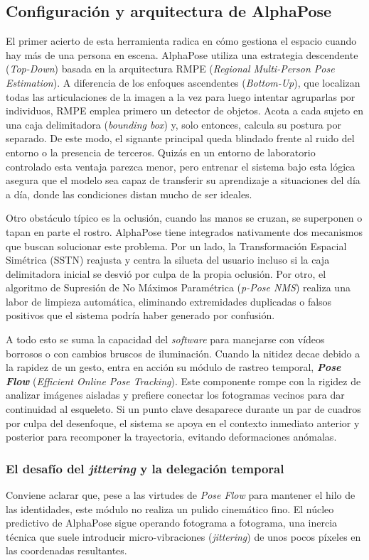\subsection{Configuración y arquitectura de AlphaPose}
El primer acierto de esta herramienta radica en cómo gestiona el espacio cuando hay más de una persona en escena.
AlphaPose utiliza una estrategia descendente (\textit{Top-Down}) basada en la arquitectura RMPE (\textit{Regional Multi-Person Pose Estimation}).
A diferencia de los enfoques ascendentes (\textit{Bottom-Up}), que localizan todas las articulaciones de la imagen a la vez para luego intentar agruparlas por individuos, RMPE emplea primero un detector de objetos.
Acota a cada sujeto en una caja delimitadora (\textit{bounding box}) y, solo entonces, calcula su postura por separado.
De este modo, el signante principal queda blindado frente al ruido del entorno o la presencia de terceros.
Quizás en un entorno de laboratorio controlado esta ventaja parezca menor, pero entrenar el sistema bajo esta lógica asegura que el modelo sea capaz de transferir su aprendizaje a situaciones del día a día, donde las condiciones distan mucho de ser ideales.

Otro obstáculo típico es la oclusión, cuando las manos se cruzan, se superponen o tapan en parte el rostro.
AlphaPose tiene integrados nativamente dos mecanismos que buscan solucionar este problema.
Por un lado, la Transformación Espacial Simétrica (SSTN) reajusta y centra la silueta del usuario incluso si la caja delimitadora inicial se desvió por culpa de la propia oclusión.
Por otro, el algoritmo de Supresión de No Máximos Paramétrica (\textit{p-Pose NMS}) realiza una labor de limpieza automática, eliminando extremidades duplicadas o falsos positivos que el sistema podría haber generado por confusión.

A todo esto se suma la capacidad del \textit{software} para manejarse con vídeos borrosos o con cambios bruscos de iluminación.
Cuando la nitidez decae debido a la rapidez de un gesto, entra en acción su módulo de rastreo temporal, \textbf{\textit{Pose Flow}} (\textit{Efficient Online Pose Tracking}).
Este componente rompe con la rigidez de analizar imágenes aisladas y prefiere conectar los fotogramas vecinos para dar continuidad al esqueleto.
Si un punto clave desaparece durante un par de cuadros por culpa del desenfoque, el sistema se apoya en el contexto inmediato anterior y posterior para recomponer la trayectoria, evitando deformaciones anómalas.

\subsubsection*{El desafío del \textit{jittering} y la delegación temporal}
Conviene aclarar que, pese a las virtudes de \textit{Pose Flow} para mantener el hilo de las identidades, este módulo no realiza un pulido cinemático fino.
El núcleo predictivo de AlphaPose sigue operando fotograma a fotograma, una inercia técnica que suele introducir micro-vibraciones (\textit{jittering}) de unos pocos píxeles en las coordenadas resultantes.

